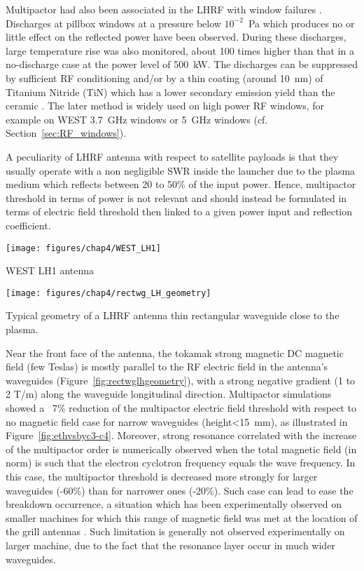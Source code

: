 Multipactor had also been associated in the LHRF with window failures . Discharges at pillbox windows at a pressure below $10^{-2}$~Pa which produces no or little effect on the reflected power have been observed. During these discharges, large temperature rise was also monitored, about 100 times higher than that in a no-discharge case at the power level of 500~kW. The discharges can be suppressed by sufficient RF conditioning and/or by a thin coating (around 10~nm) of Titanium Nitride (TiN) which has a lower secondary emission yield than the ceramic . The later method is widely used on high power RF windows, for example on WEST 3.7~GHz windows  or 5~GHz windows  (cf. Section~\ref{sec:RF_windows}).


A peculiarity of LHRF antenna with respect to satellite payloads is that they usually operate with a non negligible SWR inside the launcher due to the plasma medium which reflects between 20 to 50\% of the input power. Hence, multipactor threshold in terms of power is not relevant and should instead be formulated in terms of electric field threshold then linked to a given power input and reflection coefficient. 

\begin{marginfigure}[-1cm]
	\centering
	\texttt{[image: figures/chap4/WEST\_LH1]}
	\caption{WEST LH1 antenna}
	\label{fig:westlh1}
\end{marginfigure}

\begin{marginfigure}
	\centering
	\texttt{[image: figures/chap4/rectwg\_LH\_geometry]}
	\caption{Typical geometry of a LHRF antenna thin rectangular waveguide close to the plasma.}
	\label{fig:rectwglhgeometry}
\end{marginfigure}
Near the front face of the antenna, the tokamak strong magnetic DC magnetic field (few Teslas) is mostly parallel to the RF electric field in the antenna’s waveguides (Figure~\ref{fig:rectwglhgeometry}), with a strong negative gradient (1 to 2 T/m) along the waveguide longitudinal direction. Multipactor simulations showed a ~7\% reduction of the multipactor electric field threshold with respect to no magnetic field case for narrow waveguides (height<15~mm), as illustrated in Figure~\ref{fig:ethvsbyc3-c4}. Moreover, strong resonance correlated with the increase of the multipactor order is numerically observed when the total magnetic field (in norm) is such that the electron cyclotron frequency equals the wave frequency. In this case, the multipactor threshold is decreased more strongly for larger waveguides (-60\%) than for narrower ones (-20\%). Such case can lead to ease the breakdown occurrence, a situation which has been experimentally observed on smaller machines for which this range of magnetic field was met at the location of the grill antennas . Such limitation is generally not observed experimentally on larger machine, due to the fact that the resonance layer occur in much wider waveguides. 

